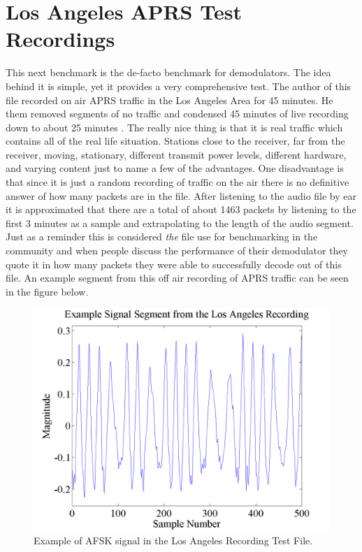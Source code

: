 \section{Los Angeles APRS Test Recordings}
This next benchmark is the de-facto benchmark for demodulators. The idea behind it is simple, yet it provides a very comprehensive test. The author of this file recorded on air APRS traffic in the Los Angeles Area for 45 minutes. He them removed segments of no traffic and condensed 45 minutes of live recording down to about 25 minutes \cite{Smith2009}. The really nice thing is that it is real traffic which contains all of the real life situation. Stations close to the receiver, far from the receiver, moving, stationary, different transmit power levels, different hardware, and varying content just to name a few of the advantages. One disadvantage is that since it is just a random recording of traffic on the air there is no definitive answer of how many packets are in the file. After listening to the audio file by ear it is approximated that there are a total of about 1463 packets by listening to the first 3 minutes as a sample and extrapolating to the length of the audio segment. Just as a reminder this is considered \textit{the} file use for benchmarking in the community and when people discuss the performance of their demodulator they quote it in how many packets they were able to successfully decode out of this file. An example segment from this off air recording of APRS traffic can be seen in the figure below.
\begin{figure}
  \centering
	\includegraphics[width=0.75\linewidth]{images/ExampleSignalSegmentfromtheLosAngelesRecording.png} 
	\caption{Example of AFSK signal in the Los Angeles Recording Test File.}
\end{figure}
